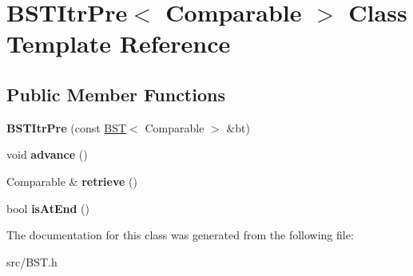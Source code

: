 \hypertarget{class_b_s_t_itr_pre}{}\section{B\+S\+T\+Itr\+Pre$<$ Comparable $>$ Class Template Reference}
\label{class_b_s_t_itr_pre}
\subsection*{Public Member Functions}
\begin{DoxyCompactItemize}
\item 
\hypertarget{class_b_s_t_itr_pre_a11b1cd4e783f153b9c1b64ce2ec8077e}{}{\bfseries B\+S\+T\+Itr\+Pre} (const \hyperlink{class_b_s_t}{B\+S\+T}$<$ Comparable $>$ \&bt)\label{class_b_s_t_itr_pre_a11b1cd4e783f153b9c1b64ce2ec8077e}

\item 
\hypertarget{class_b_s_t_itr_pre_a7a743d66a842018fd833fb2b0737254d}{}void {\bfseries advance} ()\label{class_b_s_t_itr_pre_a7a743d66a842018fd833fb2b0737254d}

\item 
\hypertarget{class_b_s_t_itr_pre_af40033e97f63bf025c2e33a9fdce4c43}{}Comparable \& {\bfseries retrieve} ()\label{class_b_s_t_itr_pre_af40033e97f63bf025c2e33a9fdce4c43}

\item 
\hypertarget{class_b_s_t_itr_pre_ae282a7b9ffa9d250bb0f6a6d79f6e8d0}{}bool {\bfseries is\+At\+End} ()\label{class_b_s_t_itr_pre_ae282a7b9ffa9d250bb0f6a6d79f6e8d0}

\end{DoxyCompactItemize}


The documentation for this class was generated from the following file\+:\begin{DoxyCompactItemize}
\item 
src/B\+S\+T.\+h\end{DoxyCompactItemize}
